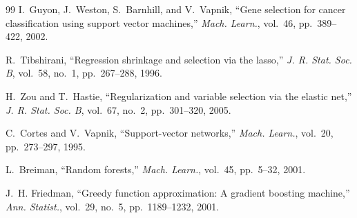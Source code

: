 \documentclass[conference]{IEEEtran}
\begin{document}
\begin{thebibliography}{99}
 I.~Guyon, J.~Weston, S.~Barnhill, and V.~Vapnik, ``Gene selection for cancer classification using support vector machines,'' \textit{Mach. Learn.}, vol.~46, pp.~389--422, 2002.

 R.~Tibshirani, ``Regression shrinkage and selection via the lasso,'' \textit{J. R. Stat. Soc. B}, vol.~58, no.~1, pp.~267--288, 1996.

 H.~Zou and T.~Hastie, ``Regularization and variable selection via the elastic net,'' \textit{J. R. Stat. Soc. B}, vol.~67, no.~2, pp.~301--320, 2005.

 C.~Cortes and V.~Vapnik, ``Support-vector networks,'' \textit{Mach. Learn.}, vol.~20, pp.~273--297, 1995.

 L.~Breiman, ``Random forests,'' \textit{Mach. Learn.}, vol.~45, pp.~5--32, 2001.

 J.~H. Friedman, ``Greedy function approximation: A gradient boosting machine,'' \textit{Ann. Statist.}, vol.~29, no.~5, pp.~1189--1232, 2001.

\end{thebibliography}
\end{document}
